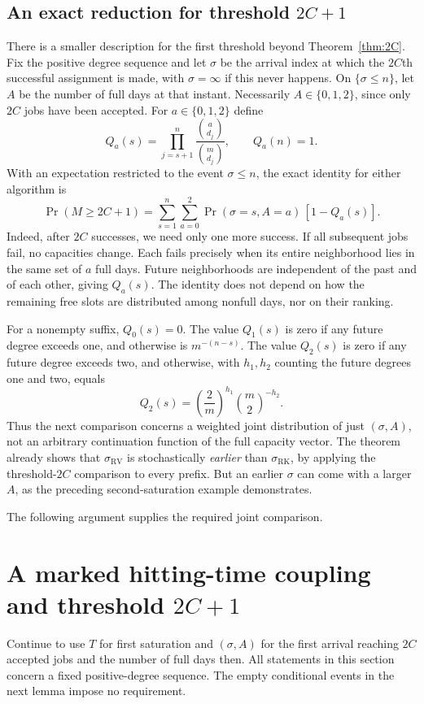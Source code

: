 \documentclass[11pt]{article}
\newcommand{\RV}{\mathrm{RV}}
\newcommand{\RK}{\mathrm{RK}}
\begin{document}
\subsection{An exact reduction for threshold $2C+1$}
There is a smaller description for the first threshold beyond
Theorem~\ref{thm:2C}.
Fix the positive degree sequence and let $\sigma$ be the arrival index
at which the $2C$th successful assignment is made, with $\sigma=\infty$
if this never happens. On $\{\sigma\leq n\}$, let $A$ be the number of
full days at that instant. Necessarily $A\in\{0,1,2\}$, since only $2C$
jobs have been accepted. For $a\in\{0,1,2\}$ define
\[
 Q_a(s)=\prod_{j=s+1}^{n}
          \frac{\binom a{d_j}}{\binom m{d_j}},
 \qquad Q_a(n)=1.
\]
With an expectation restricted to the event $\sigma\leq n$, the exact
identity for either algorithm is
\begin{equation}\label{eq:next-threshold}
 \Pr(M\geq2C+1)
 =\sum_{s=1}^{n}\sum_{a=0}^{2}
   \Pr(\sigma=s,A=a)\,[1-Q_a(s)].
\end{equation}
Indeed, after $2C$ successes, we need only one more success. If all
subsequent jobs fail, no capacities change. Each fails precisely when its
entire neighborhood lies in the same set of $a$ full days. Future
neighborhoods are independent of the past and of each other, giving
$Q_a(s)$. The identity does not depend on how the remaining free slots
are distributed among nonfull days, nor on their ranking.

For a nonempty suffix, $Q_0(s)=0$. The value $Q_1(s)$ is zero if any
future degree exceeds one, and otherwise is $m^{-(n-s)}$.
The value $Q_2(s)$ is zero if any future degree exceeds two, and otherwise,
with $h_1,h_2$ counting the future degrees one and two, equals
\[
 Q_2(s)=\left(\frac2m\right)^{h_1}
         \binom m2^{-h_2}.
\]
Thus the next comparison concerns a weighted joint distribution of just
$(\sigma,A)$, not an arbitrary continuation function of the full capacity
vector. The theorem already shows that $\sigma_\RV$ is stochastically
\emph{earlier} than $\sigma_\RK$, by applying the threshold-$2C$
comparison to every prefix. But an earlier $\sigma$ can come with a larger
$A$, as the preceding second-saturation example demonstrates.

The following argument supplies the required joint comparison.

\section{A marked hitting-time coupling and threshold $2C+1$}
Continue to use $T$ for first saturation and $(\sigma,A)$ for the first
arrival reaching $2C$ accepted jobs and the number of full days then.
All statements in this section concern a fixed positive-degree sequence.
The empty conditional events in the next lemma impose no requirement.
\end{document}
